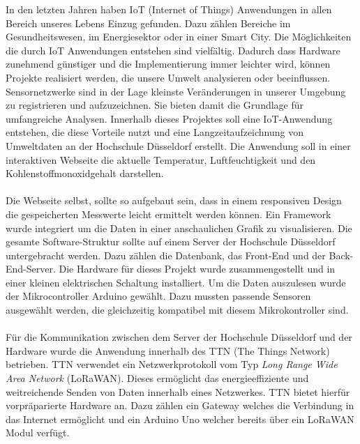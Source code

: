 \documentclass{article}
\begin{document}
In den letzten Jahren haben IoT (Internet of Things) Anwendungen in allen Bereich unseres Lebens Einzug gefunden. 
Dazu zählen Bereiche im Gesundheitswesen, im Energiesektor oder in einer Smart City.
Die Möglichkeiten die durch IoT Anwendungen entstehen sind vielfältig.
Dadurch dass Hardware zunehmend günstiger und die Implementierung immer leichter wird, können Projekte realisiert werden, die unsere Umwelt analysieren oder beeinflussen.
Sensornetzwerke sind in der Lage kleinste Veränderungen in unserer Umgebung zu registrieren und aufzuzeichnen. Sie bieten damit die Grundlage für umfangreiche Analysen.
Innerhalb dieses Projektes soll eine IoT-Anwendung entstehen, die diese Vorteile nutzt und eine Langzeitaufzeichnung von Umweltdaten an der Hochschule Düsseldorf erstellt.
Die Anwendung soll in einer interaktiven Webseite die aktuelle Temperatur, Luftfeuchtigkeit und den Kohlenstoffmonoxidgehalt darstellen.\\
\\
Die Webseite selbst, sollte so aufgebaut sein, dass in einem responsiven Design die gespeicherten Messwerte leicht ermittelt werden können.
Ein Framework wurde integriert um die Daten in einer anschaulichen Grafik zu visualisieren.
Die gesamte Software-Struktur sollte auf einem Server der Hochschule Düsseldorf untergebracht werden. Dazu zählen die Datenbank, das Front-End und der Back-End-Server.
Die Hardware für dieses Projekt wurde zusammengestellt und in einer kleinen elektrischen Schaltung installiert.
Um die Daten auszulesen wurde der Mikrocontroller Arduino gewählt.
Dazu mussten passende Sensoren ausgewählt werden, die gleichzeitig kompatibel mit diesem Mikrokontroller sind.\\
\\
Für die Kommunikation zwischen dem Server der Hochschule Düsseldorf und der Hardware wurde die Anwendung innerhalb des TTN (The Things Network) betrieben.
TTN verwendet ein Netzwerkprotokoll vom Typ \textit{Long Range Wide Area Network} (LoRaWAN). Dieses ermöglicht das energieeffiziente und weitreichende Senden von Daten innerhalb eines Netzwerkes.
TTN bietet hierfür vorpräparierte Hardware an.
Dazu zählen ein Gateway welches die Verbindung in das Internet ermöglicht und ein Arduino Uno welcher bereits über ein LoRaWAN Modul verfügt.

\end{document}
